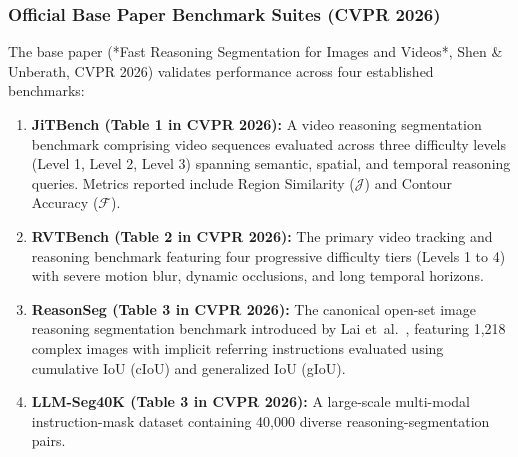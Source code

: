\documentclass[10pt,twocolumn,letterpaper]{article}
\begin{document}
\subsubsection{Official Base Paper Benchmark Suites (CVPR 2026)}
The base paper (*Fast Reasoning Segmentation for Images and Videos*, Shen \& Unberath, CVPR 2026) validates performance across four established benchmarks:
\begin{enumerate}[leftmargin=*,itemsep=1pt,topsep=1pt]
    \item \textbf{JiTBench (Table 1 in CVPR 2026):} A video reasoning segmentation benchmark comprising video sequences evaluated across three difficulty levels (Level 1, Level 2, Level 3) spanning semantic, spatial, and temporal reasoning queries. Metrics reported include Region Similarity ($\mathcal{J}$) and Contour Accuracy ($\mathcal{F}$).
    \item \textbf{RVTBench (Table 2 in CVPR 2026):} The primary video tracking and reasoning benchmark featuring four progressive difficulty tiers (Levels 1 to 4) with severe motion blur, dynamic occlusions, and long temporal horizons.
    \item \textbf{ReasonSeg (Table 3 in CVPR 2026):} The canonical open-set image reasoning segmentation benchmark introduced by Lai et~al.~\cite{lai2023lisa}, featuring 1,218 complex images with implicit referring instructions evaluated using cumulative IoU (cIoU) and generalized IoU (gIoU).
    \item \textbf{LLM-Seg40K (Table 3 in CVPR 2026):} A large-scale multi-modal instruction-mask dataset containing 40,000 diverse reasoning-segmentation pairs.
\end{enumerate}
\end{document}
